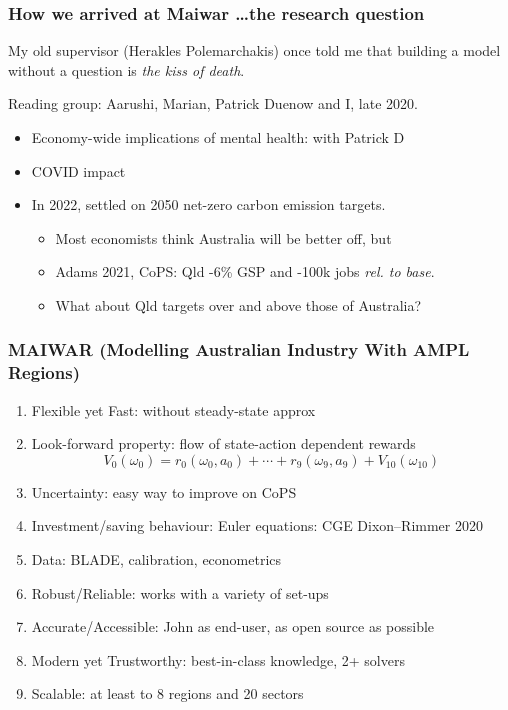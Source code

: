 \documentclass[handout,english]{beamer}
\begin{document}
\begin{frame}
  \frametitle{How we arrived at Maiwar \dots the research question}
  My old supervisor (Herakles Polemarchakis) once told me that building a model
  without a question is \emph{the kiss of death}.

  Reading group: Aarushi, Marian, Patrick Duenow and I, late 2020.
  \begin{itemize}
    \item Economy-wide implications of mental health: with Patrick D
    \item COVID impact
    \item In 2022, settled on 2050 net-zero carbon emission targets.
    \begin{itemize}
      \item Most economists think Australia will be better off, but
      \item Adams 2021, CoPS: Qld -6\% GSP and -100k jobs \emph{rel. to base}.
      \item What about Qld targets over and above those of Australia?
    \end{itemize}
  \end{itemize}
\end{frame}

\begin{frame}
  \frametitle{MAIWAR \small(Modelling Australian Industry With AMPL Regions)}
  \begin{enumerate}\footnotesize
    \item Flexible yet Fast: without steady-state approx
    \item Look-forward property: flow of state-action dependent rewards
  \[
    V_{0}(\omega_{0}) = r_{0}(\omega_{0}, a_{0}) + \cdots
    + r_{9}(\omega_{9}, a_{9}) + V_{10}(\omega_{10})
  \]
    \item Uncertainty: easy way to improve on CoPS
    \item Investment/saving behaviour: Euler equations: CGE Dixon--Rimmer 2020
    \item Data: BLADE, calibration, econometrics
    \item Robust/Reliable: works with a variety of set-ups
    \item Accurate/Accessible: John as end-user, as open source as possible
    \item Modern yet Trustworthy: best-in-class knowledge, 2+ solvers
    \item Scalable: at least to 8 regions and 20 sectors
  \end{enumerate}\normalsize
\end{frame}
\end{document}
